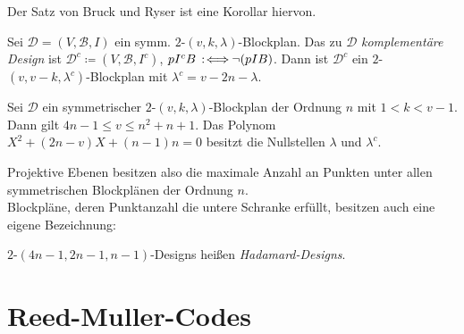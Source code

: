 \documentclass{cheat-sheet}
\newcommand{\F}{\mathbb{F}} %
\newcommand{\lin}{\text{lin}} %
\newcommand{\Design}{\mathcal{D}} %
\newcommand{\Blocks}{\mathcal{B}} %
\begin{document}
\begin{bem}
  Der Satz von Bruck und Ryser ist eine Korollar hiervon.
\end{bem}

\begin{bem}
  Sei $\Design = (V, \Blocks, I)$ ein symm. $2$-$(v, k, \lambda)$-Blockplan.
  Das zu $\Design$ \emph{komplementäre Design} ist $\Design^c \coloneqq (V, \Blocks, I^c)$, $p I^c B \!\!\enspace:\!\iff\!\! \neg (p I B)$.
  Dann ist $\Design^c$ ein $2$-$(v, v-k, \lambda^c)$-Blockplan mit $\lambda^c = v - 2n - \lambda$.
\end{bem}

\begin{satz}
  Sei $\Design$ ein symmetrischer $2$-$(v, k, \lambda)$-Blockplan der Ordnung $n$ mit $1 < k < v - 1$.
  Dann gilt \enspace
  $4n - 1 \leq v \leq n^2 + n + 1$.
  Das Polynom $X^2 + (2n - v) X + (n-1) n = 0$ besitzt die Nullstellen $\lambda$ und $\lambda^c$.
\end{satz}

\begin{bem}
  Projektive Ebenen besitzen also die maximale Anzahl an Punkten unter allen symmetrischen Blockplänen der Ordnung $n$. \\
  Blockpläne, deren Punktanzahl die untere Schranke erfüllt, besitzen auch eine eigene Bezeichnung:
\end{bem}

\begin{defn}
  $2$-$(4n{-}1, 2n{-}1, n{-}1)$-Designs heißen \emph{Hadamard-Designs}.
\end{defn}


\section{Reed-Muller-Codes}


\end{document}
